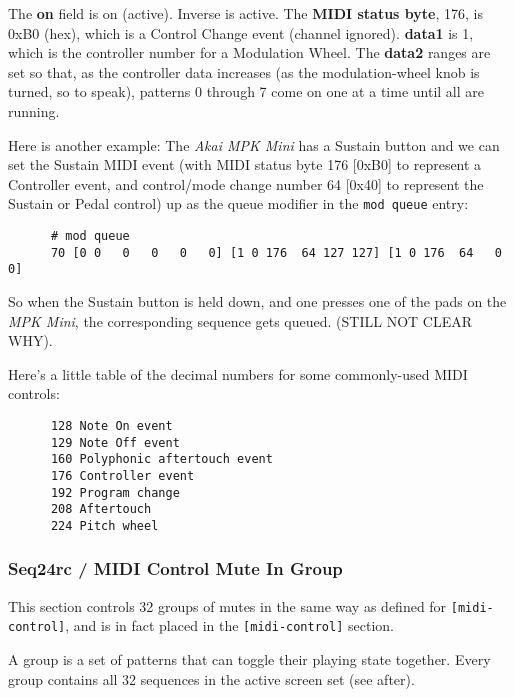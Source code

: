    The \textbf{on} field is on (active).  Inverse is active.  The
   \textbf{MIDI status byte}, 176, is 0xB0 (hex), which is a Control Change
   event (channel ignored).  \textbf{data1} is 1, which is the controller
   number for a Modulation Wheel.  The \textbf{data2} ranges are set so
   that, as the controller data increases (as the modulation-wheel knob is
   turned, so to speak), patterns 0 through 7 come on one at a time until
   all are running.

   Here is another example:
   The \textsl{Akai MPK Mini} has a Sustain button and we can set the
   Sustain MIDI event (with MIDI status byte 176 [0xB0] to represent a
   Controller event, and control/mode change number 64 [0x40] to
   represent the Sustain or Pedal control) up as the queue modifier in
   the \texttt{mod queue} entry:

   \begin{verbatim}
      # mod queue
      70 [0 0   0   0   0   0] [1 0 176  64 127 127] [1 0 176  64   0   0]
   \end{verbatim}

   So when the Sustain button is held down, and one presses one of the pads
   on the \textsl{MPK Mini}, the corresponding sequence gets queued.
   (STILL NOT CLEAR WHY).

   Here's a little table of the decimal numbers for some commonly-used MIDI
   controls:

   \begin{verbatim}
      128 Note On event 
      129 Note Off event 
      160 Polyphonic aftertouch event
      176 Controller event 
      192 Program change 
      208 Aftertouch 
      224 Pitch wheel 
   \end{verbatim}

\subsubsection{Seq24rc / MIDI Control Mute In Group}
\label{subsubsec:seq24_rc_file_midi_control_mute_in_group}

   This section controls 32 groups of mutes in the same way as 
	defined for \texttt{[midi-control]}, and is in fact placed in the
   \texttt{[midi-control]} section.

   A group is a set of patterns that can toggle their playing state
   together.  Every group contains all 32 sequences in the active screen set
   (see after).

